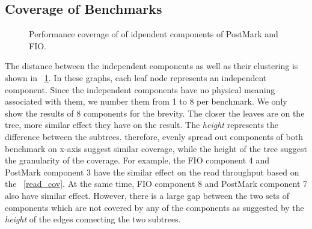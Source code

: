 \subsection{Coverage of Benchmarks}
\begin{figure}
\centering
{}
\caption{Performance coverage of of idpendent components of PostMark and FIO.}
\label{cov}
\end{figure}
The distance between the independent components as well as their clustering is shown in \figurename~\ref{cov}. 
In these graphs, each leaf node represents an independent component. 
Since the independent components have no physical meaning associated with them, we number them from 1 to 8 per benchmark. 
We only show the results of 8 components for the brevity. The closer the leaves are on the tree, more similar effect they have on the result. The \emph{height} represents the difference between the subtrees. therefore, evenly spread out components of both benchmark on x-axis suggest similar coverage, while the height of the tree suggest the granularity of the coverage. For example, the FIO component 4 and PostMark component 3 have the similar effect on the read throughput based on the \figurename~\ref{read_cov}. At the same time, FIO component 8 and PostMark component 7 also have similar effect. However, there is a large gap between the two sets of components which are not covered by any of the components as suggested by the \emph{height} of the edges connecting the two subtrees.

